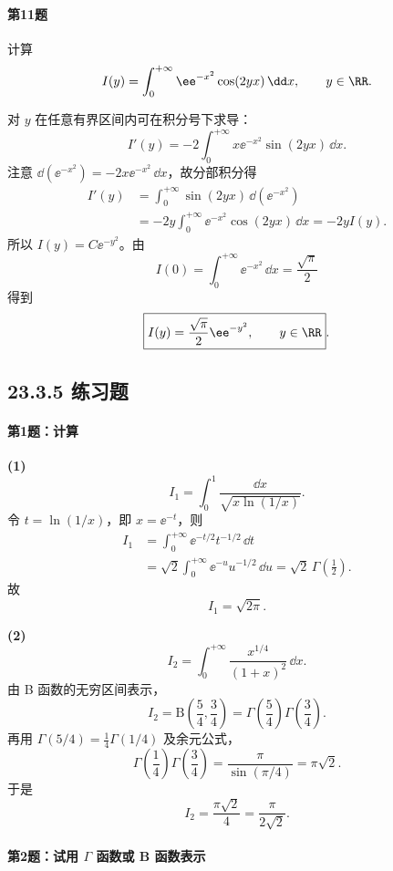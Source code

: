 \paragraph{第11题}
计算
\[
I(y)=\int_0^{+\infty}\ee^{-x^2}\cos(2yx)\,\dd x,
\qquad y\in\RR.
\]

\begin{xsolution}
对 $y$ 在任意有界区间内可在积分号下求导：
\[
I'(y)=-2\int_0^{+\infty}x\ee^{-x^2}\sin(2yx)\,\dd x.
\]
注意 $\dd(\ee^{-x^2})=-2x\ee^{-x^2}\,\dd x$，故分部积分得
\[
\begin{aligned}
I'(y)
&=\int_0^{+\infty}\sin(2yx)\,\dd(\ee^{-x^2})\\
&=-2y\int_0^{+\infty}\ee^{-x^2}\cos(2yx)\,\dd x
=-2yI(y).
\end{aligned}
\]
所以 $I(y)=C\ee^{-y^2}$。由
\[
I(0)=\int_0^{+\infty}\ee^{-x^2}\,\dd x=\frac{\sqrt\pi}{2}
\]
得到
\[
\boxed{I(y)=\frac{\sqrt\pi}{2}\ee^{-y^2},\qquad y\in\RR}.
\]
\end{xsolution}

\subsection*{23.3.5 练习题}

\paragraph{第1题：计算}

\begin{xsolution}
\textbf{(1)}
\[
I_1=\int_0^1\frac{\dd x}{\sqrt{x\ln(1/x)}}.
\]
令 $t=\ln(1/x)$，即 $x=\ee^{-t}$，则
\[
\begin{aligned}
I_1
&=\int_0^{+\infty}\ee^{-t/2}t^{-1/2}\,\dd t\\
&=\sqrt2\int_0^{+\infty}\ee^{-u}u^{-1/2}\,\dd u
=\sqrt2\,\Gamma\left(\frac12\right).
\end{aligned}
\]
故
\[
\boxed{I_1=\sqrt{2\pi}}.
\]

\textbf{(2)}
\[
I_2=\int_0^{+\infty}\frac{x^{1/4}}{(1+x)^2}\,\dd x.
\]
由 B 函数的无穷区间表示，
\[
I_2=\mathrm{B}\left(\frac54,\frac34\right)
=\Gamma\left(\frac54\right)\Gamma\left(\frac34\right).
\]
再用 $\Gamma(5/4)=\frac14\Gamma(1/4)$ 及余元公式，
\[
\Gamma\left(\frac14\right)\Gamma\left(\frac34\right)
=\frac\pi{\sin(\pi/4)}=\pi\sqrt2.
\]
于是
\[
\boxed{I_2=\frac{\pi\sqrt2}{4}=\frac\pi{2\sqrt2}}.
\]
\end{xsolution}

\paragraph{第2题：试用 $\Gamma$ 函数或 B 函数表示}

